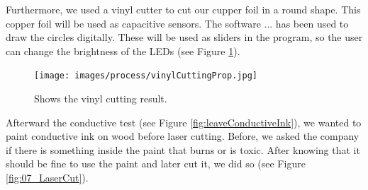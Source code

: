 \documentclass[00_doc.tex]{subfiles}
\begin{document}
    \noindent
    Furthermore, we used a vinyl cutter \cite{vinylCutter}  to cut our cupper foil in a 
    round shape. This copper foil will be used as capacitive sensors. The software ... 
    has been used to draw the circles digitally. These will be used as sliders in the 
    program, so the user can change the brightness of the LEDs (see Figure \ref{fig:vinylCuttingProp}).

    \begin{figure}[h!]
        \centering
        \texttt{[image: images/process/vinylCuttingProp.jpg]}
        \caption{Shows the vinyl cutting result.}
        \label{fig:vinylCuttingProp}
    \end{figure}

    \noindent
    Afterward the conductive test (see Figure \ref{fig:leaveConductiveInk}), we wanted to paint 
    conductive ink on wood before laser cutting. Before, we asked the company if there is 
    something inside the paint that burns or is toxic. After knowing that it should be fine to 
    use the paint and later cut it, we did so (see Figure \ref{fig:07_LaserCut}). 
\end{document}
